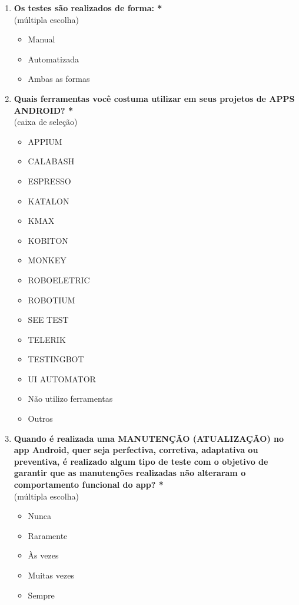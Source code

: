 \begin{enumerate}[label=\bf A\arabic*,leftmargin=1.8cm]
\begin{enumerate}[label= \arabic*]
    \item \textbf{Os testes são realizados de forma: *}\\
    (múltipla escolha)
     \begin{itemize}
        \item Manual
        \item Automatizada
        \item Ambas as formas
     \end{itemize}
    
     \item \textbf{Quais ferramentas você costuma utilizar em seus projetos de \ac{APPS} ANDROID? *}\\
     (caixa de seleção)
     \begin{itemize}
         \item APPIUM
         \item CALABASH
         \item ESPRESSO
         \item KATALON
         \item KMAX
         \item KOBITON
         \item MONKEY
         \item ROBOELETRIC
         \item ROBOTIUM
         \item SEE TEST
         \item TELERIK
         \item TESTINGBOT
         \item UI AUTOMATOR
         \item Não utilizo ferramentas
         \item Outros
     \end{itemize}
     
    \item \textbf{Quando é realizada uma MANUTENÇÃO (ATUALIZAÇÃO) no app Android, quer seja perfectiva, corretiva, adaptativa ou preventiva, é realizado algum tipo de teste com o objetivo de garantir que as manutenções realizadas não alteraram o comportamento funcional do app? *}\\
    (múltipla escolha)
    \begin{itemize}
        \item Nunca
        \item Raramente
        \item Às vezes
        \item Muitas vezes
        \item Sempre
    \end{itemize}
    

\end{enumerate}
\end{enumerate}
